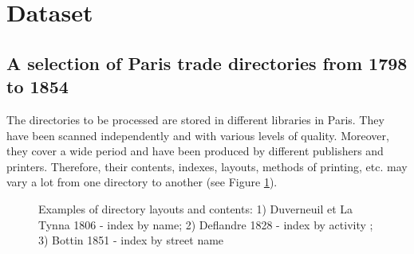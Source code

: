 \section{Dataset}
\label{sec:dataset}






\subsection{A selection of Paris trade directories from 1798 to 1854}

The directories to be processed are stored in different libraries in Paris. They have been scanned independently and with various levels of quality. Moreover, they cover a wide period and have been produced by different publishers and printers. Therefore, their contents, indexes, layouts, methods of printing, etc. may vary a lot from one directory to another (see Figure \ref{fig:directories}).


\begin{figure}[htb!]
	  \caption{\label{fig:directories} Examples of directory layouts and contents: 1) Duverneuil et La Tynna 1806 - index by name; 2) Deflandre 1828 - index by activity ; 3) Bottin 1851 - index by street name}
\end{figure}

